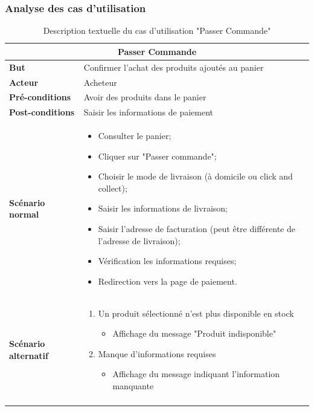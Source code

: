 \subsubsection{Analyse des cas d'utilisation}
\begin{longtable}{|p{4cm}|p{11cm}|}
\hline
\multicolumn{2}{|c|}{\textbf{Passer Commande}} \\ \hline
\textbf{But} & Confirmer l'achat des produits ajoutés au panier \\ \hline
\textbf{Acteur} & Acheteur \\ \hline
\textbf{Pré-conditions} & Avoir des produits dans le panier \\ \hline
\textbf{Post-conditions} & Saisir les informations de paiement \\ \hline
\textbf{Scénario normal} &
\begin{itemize}
    \item Consulter le panier;
    \item Cliquer sur "Passer commande";
    \item Choisir le mode de livraison (à domicile ou click and collect);
    \item Saisir les informations de livraison;
    \item Saisir l'adresse de facturation (peut être différente de l'adresse de livraison);
    \item Vérification les informations requises;
    \item Redirection vers la page de paiement.
\end{itemize} \\ \hline
\textbf{Scénario alternatif} &
\begin{enumerate}
    \item Un produit sélectionné n'est plus disponible en stock
    \begin{itemize}
        \item Affichage du message "Produit indisponible"
    \end{itemize}
    \item Manque d'informations requises
    \begin{itemize}
        \item Affichage du message indiquant l'information manquante
    \end{itemize}
\end{enumerate} \\ \hline
\caption{Description textuelle du cas d'utilisation "Passer Commande"}
\label{tab:passer_commande}
\end{longtable}

